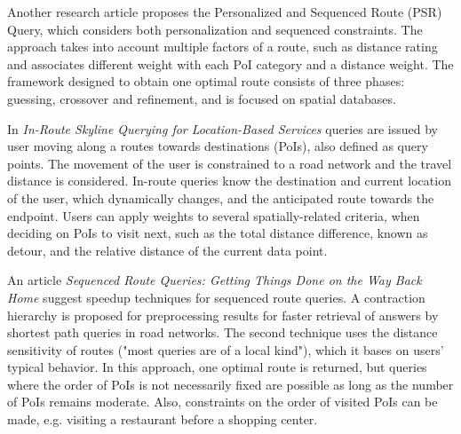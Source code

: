 Another research article proposes the Personalized and Sequenced Route (PSR) Query, which considers both personalization and sequenced constraints. The approach takes into account multiple factors of a route, such as distance rating and associates different weight with each PoI category and a distance weight. The framework designed to obtain one optimal route consists of three phases: guessing, crossover and refinement, and is focused on spatial databases. \cite{personalSRQ} 
\newline

In \textit{In-Route Skyline Querying for Location-Based Services} queries are issued by user moving along a routes towards destinations (PoIs), also defined as query points. The movement of the user is constrained to a road network and the travel distance is considered. In-route queries know the destination and current location of the user, which dynamically changes, and the anticipated route towards the endpoint. Users can apply weights to several spatially-related criteria, when deciding on PoIs to visit next, such as the total distance difference, known as detour, and the relative distance of the current data point. \cite{dynamicSRQ}
\newline

An article \textit{Sequenced Route Queries: Getting Things Done on the Way Back Home} suggest speedup techniques for sequenced route queries. A contraction hierarchy is proposed for preprocessing results for faster retrieval of answers by shortest path queries in road networks. The second technique uses the distance sensitivity of routes ("most queries are of a local kind"), which it bases on users' typical behavior. In this approach, one optimal route is returned, but queries where the order of PoIs is not necessarily fixed are possible as long as the number of PoIs remains moderate. Also, constraints on the order of visited PoIs can be made, e.g. visiting a restaurant before a shopping center. \cite{skyline}